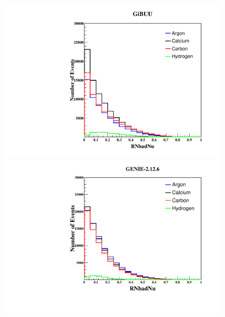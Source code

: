 \documentclass[9pt]{beamer}    %
\begin{document}
\begin{frame}
\begin{figure}
 \includegraphics[scale=0.23]{AllTargetsRNhadNu}
\includegraphics[scale=0.25]{AllTargetRNhadNu}

\end{figure}
\end{frame}
\end{document}
